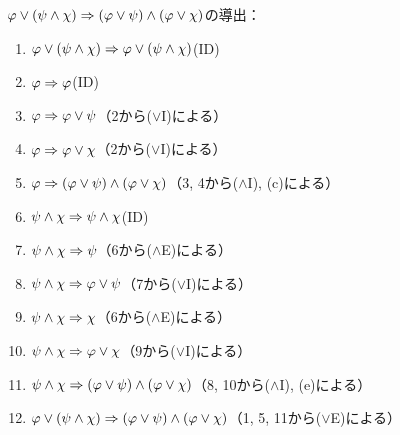\(\varphi \lor \paren{\psi \land \chi} \sequent \paren{\varphi \lor \psi} \land \paren{\varphi \lor \chi}\)の導出：
\begin{enumerate}
	\item \(\varphi \lor \paren{\psi \land \chi} \sequent \varphi \lor \paren{\psi \land \chi}\)\quad (ID)
	\item \(\varphi \Rightarrow \varphi\)\quad (ID)
	\item \(\varphi \Rightarrow \varphi \lor \psi\)\quad （2から(\(\lor\)I)による）
	\item \(\varphi \Rightarrow \varphi \lor \chi\)\quad （2から(\(\lor\)I)による）
	\item \(\varphi \sequent \paren{\varphi \lor \psi} \land \paren{\varphi \lor \chi}\)\quad （3, 4から(\(\land\)I), (c)による）
	\item \(\psi \land \chi \Rightarrow \psi \land \chi\)\quad (ID)
	\item \(\psi \land \chi \Rightarrow \psi\)\quad （6から(\(\land\)E)による）
	\item \(\psi \land \chi \Rightarrow \varphi \lor \psi\)\quad （7から(\(\lor\)I)による）
	\item \(\psi \land \chi \Rightarrow \chi\)\quad （6から(\(\land\)E)による）
	\item \(\psi \land \chi \Rightarrow \varphi \lor \chi\)\quad （9から(\(\lor\)I)による）
	\item \(\psi \land \chi \sequent \paren{\varphi \lor \psi} \land \paren{\varphi \lor \chi}\)\quad （8, 10から(\(\land\)I), (e)による）
	\item \(\varphi \lor \paren{\psi \land \chi} \sequent \paren{\varphi \lor \psi} \land \paren{\varphi \lor \chi}\)\quad （1, 5, 11から(\(\lor\)E)による）
\end{enumerate}

